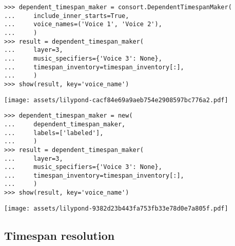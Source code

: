 \begin{singlespacing}
\vspace{-0.5\baselineskip}
\begin{lstlisting}
>>> dependent_timespan_maker = consort.DependentTimespanMaker(
...     include_inner_starts=True,
...     voice_names=('Voice 1', 'Voice 2'),
...     )
>>> result = dependent_timespan_maker(
...     layer=3,
...     music_specifiers={'Voice 3': None},
...     timespan_inventory=timespan_inventory[:],
...     )
>>> show(result, key='voice_name')
\end{lstlisting}
\noindent\texttt{[image: assets/lilypond-cacf84e69a9aeb754e2908597bc776a2.pdf]}
\end{singlespacing}

\begin{comment}
<abjad>
dependent_timespan_maker = new(
    dependent_timespan_maker,
    labels=['labeled'],
    )
result = dependent_timespan_maker(
    layer=3,
    music_specifiers={'Voice 3': None},
    timespan_inventory=timespan_inventory[:],
    )
show(result, key='voice_name')
</abjad>
\end{comment}

\begin{singlespacing}
\vspace{-0.5\baselineskip}
\begin{lstlisting}
>>> dependent_timespan_maker = new(
...     dependent_timespan_maker,
...     labels=['labeled'],
...     )
>>> result = dependent_timespan_maker(
...     layer=3,
...     music_specifiers={'Voice 3': None},
...     timespan_inventory=timespan_inventory[:],
...     )
>>> show(result, key='voice_name')
\end{lstlisting}
\noindent\texttt{[image: assets/lilypond-9382d23b443fa753fb33e78d0e7a805f.pdf]}
\end{singlespacing}

\subsection{Timespan resolution}

\begin{comment}
<abjad>
layer_1_timespan_maker = consort.FloodedTimespanMaker()
layer_1_target_timespan = timespantools.Timespan(0, (19, 4))
layer_1_music_specifiers = collections.OrderedDict([
    ('Voice 2', None),
    ('Voice 3', None),
    ])
layer_1 = layer_1_timespan_maker(
    layer=1,
    music_specifiers=layer_1_music_specifiers,
    target_timespan=layer_1_target_timespan,
    )
show(layer_1, key='voice_name', range_=(0, (21, 4)))
</abjad>
\end{comment}

